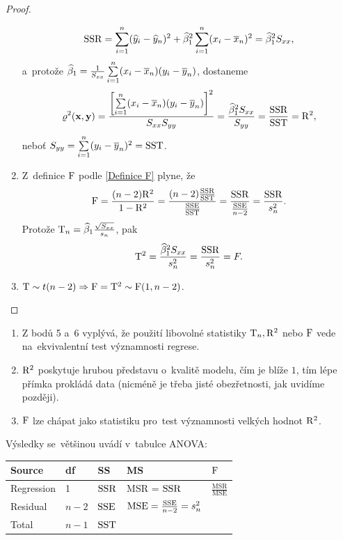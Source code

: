\begin{theorem}
\begin{proof}
\begin{enumerate}
		$$ \mathrm{SSR} = \sum\limits_{i=1}^{n} (\widehat{y}_i-\widehat{y}_n)^2+\widehat{\beta}_1^2\sum\limits_{i=1}^{n} (x_i-\overline{x}_n)^2 = \widehat{\beta}_1^2 S_{xx}, $$
		a~protože $\widehat{\beta}_1 = \frac{1}{S_{xx}}\sum\limits_{i=1}^{n} (x_i-\overline{x}_n)(y_i-\overline{y}_n)$, dostaneme
		 $$ \varrho^2(\textbf{x},\textbf{y}) = \frac{\left[\sum\limits_{i=1}^{n} (x_i-\overline{x}_n)(y_i-\overline{y}_n)\right]^2}{S_{xx} S_{yy}} = \frac{\widehat{\beta}_1^2 S_{xx}}{S_{yy}} = \frac{\mathrm{SSR}}{\mathrm{SST}} = \mathrm{R}^2, $$
		 neboť $S_{yy} = \sum\limits_{i=1}^{n} (y_i-\overline{y}_n)^2 = \mathrm{SST}$.
		\item Z~definice $\mathrm{F}$ podle \eqref{Definice F} plyne, že
		 $$ \mathrm{F} = \frac{(n-2)\mathrm{R}^2}{1-\mathrm{R}^2} = \frac{(n-2)\frac{\mathrm{SSR}}{\mathrm{SST}}}{\frac{\mathrm{SSE}}{\mathrm{SST}}} = \frac{\mathrm{SSR}}{\frac{\mathrm{SSE}}{n-2}} = \frac{\mathrm{SSR}}{s_n^2}. $$ Protože $\mathrm{T}_n = \widehat{\beta}_1\frac{\sqrt{S_{xx}}}{s_n}$, pak $$ \mathrm{T}^2 = \frac{\widehat{\beta}_1^2 S_{xx}}{s_n^2} = \frac{\mathrm{SSR}}{s_n^2} = F. $$
		\item $\mathrm{T}\sim t(n-2) \Rightarrow \mathrm{F} = \mathrm{T}^2\sim\mathrm{F}(1,n-2)$.
		
	\end{enumerate}
\end{proof}
\end{theorem}
\begin{remark}
\begin{enumerate}
	\item 	Z bodů 5 a~6 vyplývá, že použití libovolné statistiky $\mathrm{T}_n,\mathrm{R}^2$ nebo $\mathrm{F}$ vede na~ekvivalentní test významnosti regrese.
	\item $\mathrm{R}^2$ poskytuje hrubou představu o~kvalitě modelu, čím je blíže $1$, tím lépe přímka prokládá data (nicméně je třeba jisté obezřetnosti, jak uvidíme později).
	\item $\mathrm{F}$ lze chápat jako statistiku pro~test významnosti velkých hodnot $\mathrm{R}^2$.
\end{enumerate}
\end{remark}
Výsledky se~většinou uvádí v~tabulce ANOVA:
\begin{table}[h]\label{ANOVA_table}
	\begin{tabular}{|lllll|}
	\hline
	Source & df & SS & MS & $\mathrm{F}$\\
	\hline
	Regression & 1 & $\mathrm{SSR}$ & MSR = $\mathrm{SSR}$ & $\frac{\mathrm{MSR}}{\mathrm{MSE}}$ \\
	Residual & $n-2$ & $\mathrm{SSE}$ & $\mathrm{MSE} = \frac{\mathrm{\mathrm{SSE}}}{n-2} = s_n^2$ & \\
	Total & $n-1$ & $\mathrm{SST}$ & & \\ \hline
\end{tabular}
\end{table}

